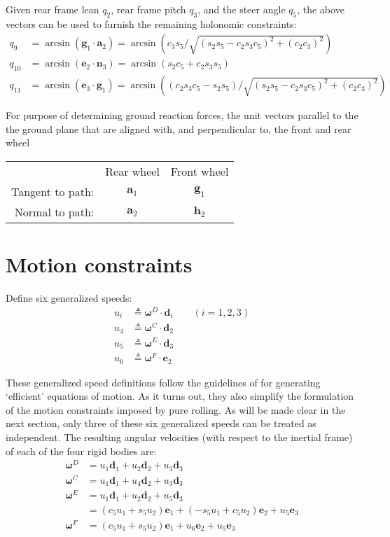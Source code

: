 \documentclass[letterpaper,11pt]{article}
\newcommand{\bs}[1]{ \boldsymbol{ #1 } }
\begin{document}
Given rear frame lean $q_2$, rear frame pitch $q_3$, and the steer angle
$q_5$, the above vectors can be used to furnish the remaining holonomic
constraints:
\begin{align*}
  q_9 & = \arcsin(\bs{g}_1 \cdot \bs{a}_2) = \arcsin\left(c_3 s_5 / \sqrt{(s_2 s_5 -
  c_2 s_3 c_5)^2 + (c_2 c_3)^2}\right) \\
  q_{10} & = \arcsin(\bs{e}_2 \cdot \bs{n}_3) = \arcsin\left(s_2 c_5 + c_2 s_3
  s_5\right)
  \\
  q_{11} & = \arcsin(\bs{e}_3 \cdot \bs{g}_1) = \arcsin \left( (c_2 s_3 c_5 - s_2
    s_5) /\sqrt{(s_2 s_5 - c_2 s_3 c_5)^2 + (c_2 c_3)^2}\right)
\end{align*}

For purpose of determining ground reaction forces, the unit vectors parallel to
the the ground plane that are aligned with, and perpendicular to, the front and
rear wheel

\begin{tabular}{rcc}
  & Rear wheel & Front wheel \\
  Tangent to path: & $\bs{a}_1$ & $\bs{g}_1$\\
  Normal to path: & $\bs{a}_2$ & $\bs{h}_2$
\end{tabular}


\section*{Motion constraints}
Define six generalized speeds:
\begin{align*}
  u_i & \triangleq \bs{\omega}^D \cdot \bs{d}_i \qquad (i = 1, 2, 3)\\
  u_4 & \triangleq \bs{\omega}^C \cdot \bs{d}_2\\
  u_5 & \triangleq \bs{\omega}^E \cdot \bs{d}_3\\
  u_6 & \triangleq \bs{\omega}^F \cdot \bs{e}_2
\end{align*}

These generalized speed definitions follow the guidelines of \cite{Mitiguy1996}
for generating `efficient' equations of motion.  As it turns out, they also
simplify the formulation of the motion constraints imposed by pure rolling.  As
will be made clear in the next section, only three of these six generalized
speeds can be treated as independent.  The resulting angular velocities (with
respect to the inertial frame) of each of the four rigid bodies are:
\begin{align*}
  \bs{\omega}^D & = u_1 \bs{d}_1 + u_2 \bs{d}_2 + u_3 \bs{d}_3 \\
  \bs{\omega}^C & = u_1 \bs{d}_1 + u_4 \bs{d}_2 + u_3 \bs{d}_3 \\
  \bs{\omega}^E & = u_1 \bs{d}_1 + u_2 \bs{d}_2 + u_5 \bs{d}_3 \\
                & = (c_5 u_1 + s_5 u_2)\bs{e}_1 + (-s_5 u_1 + c_5 u_2) \bs{e}_2
                    + u_5 \bs{e}_3 \\
  \bs{\omega}^F & = (c_5 u_1 + s_5 u_2)\bs{e}_1 + u_6 \bs{e}_2
                    + u_5 \bs{e}_3
\end{align*}
\end{document}
